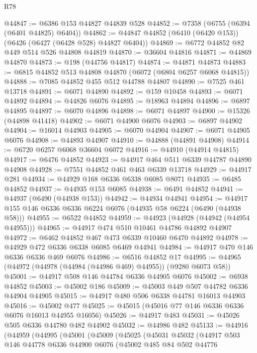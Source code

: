 \begin{lexlean}{R78}
\begin{coremodule}
@44847 := @6386 @153 @44827 @44839 @528
@44852 := @7358 (@6755 (@6394 (@6401 @44825) @6404))
@44862 := @44847 @44852 (@6410 (@6420 @153)) (@6426 (@6427 (@6428 @528) @44827 @6404))
@44869 := @6772 @44852 @82 @449 @514 @526 @44808 @44819
@44870 := @36604 @44816
@44871 := @44869 @44870
@44873 := @198 (@44756 @44817)
@44874 := @44871 @44873
@44883 := @6815 @44852 @513 @44808 @44870 (@6072 (@6804 @6257 @6068 @44815))
@44888 := @7085 @44852 @455 @512 @44788 @44807
@44890 := @7525 @461 @13718
@44891 := @6071 @44890
@44892 := @159 @10458
@44893 := @6071 @44892
@44894 := @44826 @6076
@44895 := @18963 @44894
@44896 := @6897 @44895
@44897 := @6070 @44896
@44898 := @6071 @44897
@44900 := @15326 (@44898 @41418)
@44902 := @6071 @44900 @6076
@44903 := @6897 @44902
@44904 := @16014 @44903
@44905 := @6070 @44904
@44907 := @6071 @44905 @6076
@44908 := @44893 @44907
@44910 := @44888 (@44891 @44908)
@44914 := @6720 @6257 @6068 @36604 @6072
@44916 := @44910 (@44914 @44815)
@44917 := @6476 @44852
@44923 := @44917 @464 @511 @6339 @44787 @44890 @44908
@44928 := @7551 @44852 @461 @463 @6339 @13718
@44929 := @44917 @281
@44934 := @44929 @168 @6336 @6338 @6085 @8071
@44935 := @6485 @44852
@44937 := @44935 @153 @6085
@44938 := @6491 @44852
@44941 := @44937 (@6490 (@44938 @153))
@44942 := @44934 @44941
@44954 := @44917 @155 @146 @6336 @6336 @6224 @6076 (@44935 @58 @6224 (@6490 (@44938 @58)))
@44955 := @6522 @44852
@44959 := @44923 (@44928 (@44942 (@44954 @44955)))
@44965 := @44917 @474 @510 @10461 @44786 @44892 @44907
@44972 := @6462 @44852 @467 @473 @6339 @10460 @6470 @44892
@44978 := @44929 @472 @6336 @6338 @6085 @6469 @44941
@44984 := @44917 @470 @146 @6336 @6336 @469 @6076
@44986 := @6516 @44852 @17
@44995 := @44965 (@44972 (@44978 (@44984 (@44986 @469) @44955)) (@9280 @6073 @58))
@45001 := @44917 @508 @146 @44784 @6336 @44905 @6076
@45002 := @6938 @44852
@45003 := @45002 @186
@45009 := @45003 @449 @507 @44782 @6336 @44904 @44905
@45015 := @44917 @480 @506 @6338 @44781 @16013 @44903
@45016 := @45002 @477
@45025 := @45015 (@45016 @77 @146 @6336 @6336 @6076 @16013 @44955 @16056)
@45026 := @44917 @483
@45031 := @45026 @505 @6336 @44780 @482 @44902
@45032 := @44986 @482
@45133 := @44916
    (@44959
      (@44995
        (@45001
          (@45009
            (@45025
              (@45031
                @45032
                (@44917
                  @503
                  @146
                  @44778
                  @6336
                  @44900
                  @6076
                  (@45002
                    @485
                    @84
                    @502
                    @44776

\end{coremodule}
\end{lexlean}
